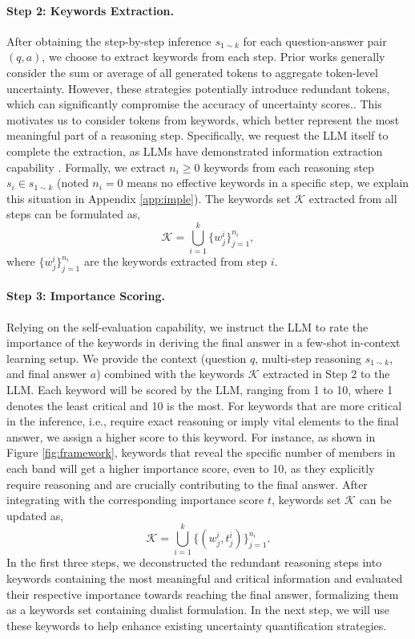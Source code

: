 \documentclass[11pt]{article}
\begin{document}
\paragraph{Step 2: Keywords Extraction.}
After obtaining the step-by-step inference $s_{1 \sim k}$ for each question-answer pair $(q, a)$, we choose to extract keywords from each step. 
Prior works generally consider the sum or average of all generated tokens \citep{slobodkin2023curious} to aggregate token-level uncertainty. 
However, these strategies potentially introduce redundant tokens, which can significantly compromise the accuracy of uncertainty scores.\citep{gupta2024language}.
This motivates us to consider tokens from keywords, which better represent the most meaningful part of a reasoning step. Specifically, we request the LLM itself to complete the extraction, as LLMs have demonstrated information extraction capability \citep{ashok2023promptner, orgad2024llms}. Formally, we extract $n_i \ge 0$ keywords from each reasoning step $s_i\in s_{1\sim k}$ (noted $n_i=0$ means no effective keywords in a specific step, we explain this situation in Appendix \ref{app:imple}). The keywords set $\mathcal{K}$ extracted from all steps can be formulated as, 
\begin{equation}
\label{eq:3}
    \mathcal{K} = \bigcup_{i=1}^k \{w_j^i\}_{j=1}^{n_i},
\end{equation}
where $\{w_j^i\}_{j=1}^{n_i}$ are the keywords extracted from step $i$.

\paragraph{Step 3: Importance Scoring.}
Relying on the self-evaluation \citep{ren2023self} capability, we instruct the LLM to rate the importance of the keywords in deriving the final answer in a few-shot in-context learning setup. We provide the context (question $q$, multi-step reasoning $s_{1 \sim k}$, and final answer $a$) combined with the keywords $\mathcal{K}$ extracted in Step 2 to the LLM. Each keyword will be scored by the LLM, ranging from 1 to 10, where 1 denotes the least critical and 10 is the most. For keywords that are more critical in the inference, i.e., require exact reasoning or imply vital elements to the final answer, we assign a higher score to this keyword. For instance, as shown in Figure \ref{fig:framework}, keywords that reveal the specific number of members in each band will get a higher importance score, even to 10, as they explicitly require reasoning and are crucially contributing to the final answer. After integrating with the corresponding importance score $t$, keywords set $\mathcal{K}$ can be updated as,
\begin{equation}
\label{eq:4}
    \mathcal{K} = \bigcup_{i=1}^k \{(w_j^i, t_j^i)\}_{j=1}^{n_i}.
\end{equation}
In the first three steps, we deconstructed the redundant reasoning steps into keywords containing the most meaningful and critical information and evaluated their respective importance towards reaching the final answer, formalizing them as a keywords set containing dualist formulation. In the next step, we will use these keywords to help enhance existing uncertainty quantification strategies.
\end{document}
